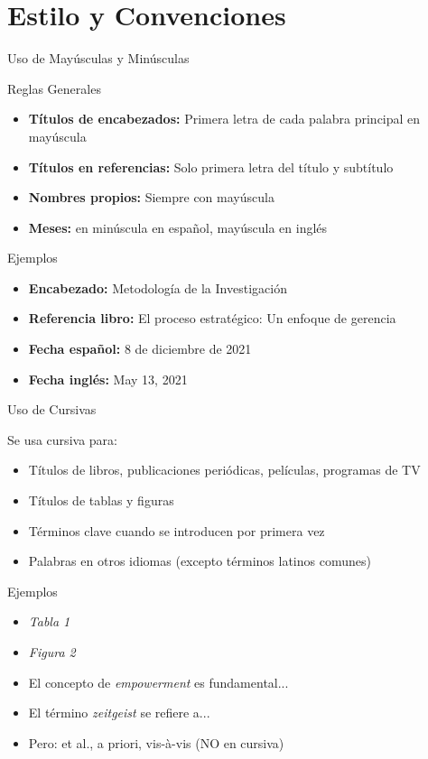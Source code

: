 \documentclass[spanish,aspectratio=169]{beamer}
\begin{document}
	\section{Estilo y Convenciones}
	
	\begin{frame}{Uso de Mayúsculas y Minúsculas}
		\begin{block}{Reglas Generales}
			\begin{itemize}
				\item \textbf{Títulos de encabezados:} Primera letra de cada palabra principal en mayúscula
				\item \textbf{Títulos en referencias:} Solo primera letra del título y subtítulo
				\item \textbf{Nombres propios:} Siempre con mayúscula
				\item \textbf{Meses:} en minúscula en español, mayúscula en inglés
			\end{itemize}
		\end{block}
		
		\begin{exampleblock}{Ejemplos}
			\begin{itemize}
				\item \textbf{Encabezado:} Metodología de la Investigación
				\item \textbf{Referencia libro:} El proceso estratégico: Un enfoque de gerencia
				\item \textbf{Fecha español:} 8 de diciembre de 2021
				\item \textbf{Fecha inglés:} May 13, 2021
			\end{itemize}
		\end{exampleblock}
	\end{frame}
	
	\begin{frame}{Uso de Cursivas}
		\begin{block}{Se usa cursiva para:}
			\begin{itemize}
				\item Títulos de libros, publicaciones periódicas, películas, programas de TV
				\item Títulos de tablas y figuras
				\item Términos clave cuando se introducen por primera vez
				\item Palabras en otros idiomas (excepto términos latinos comunes)
			\end{itemize}
		\end{block}
		
		\begin{exampleblock}{Ejemplos}
			\begin{itemize}
				\item \textit{Tabla 1}
				\item \textit{Figura 2}
				\item El concepto de \textit{empowerment} es fundamental...
				\item El término \textit{zeitgeist} se refiere a...
				\item Pero: et al., a priori, vis-à-vis (NO en cursiva)
			\end{itemize}
		\end{exampleblock}
	\end{frame}
	
\end{document}
